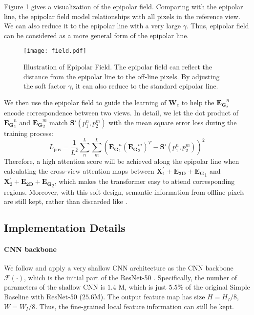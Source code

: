 \documentclass{bmvc2k}
\begin{document}
Figure \ref{fig:epipolar_example} gives a visualization of the epipolar field. Comparing with the epipolar line, the epipolar field model relationships with all pixels in the reference view. We can also reduce it to the epipolar line with a very large $\gamma$. Thus, epipolar field can be considered as a more general form of the epipolar line.  
\begin{figure}[!ht]
    \centering
    \texttt{[image: field.pdf]}
    \vspace{-1 em}
    \caption{ \footnotesize{Illustration of Epipolar Field. The epipolar field can reflect the distance from the epipolar line to the off-line pixels. By adjusting the soft factor $\gamma$, it can also reduce to the standard epipolar line.}  }
    \label{fig:epipolar_example}
\end{figure}

We then use the epipolar field to guide the learning of $\mathbf{W}_e$ to help the $\mathbf{E_G}_{i}^{n}$ encode correspondence between two views. 
In detail, we let the dot product of $\mathbf{E_G}_{1}^{n}$ and $\mathbf{E_G}_{2}^{m}$ match $\mathbf{S}'(p_1^n, p_2^m)$ with the mean square error loss during the training process: 
\begin{equation}
    \label{eq:loss_pos}
    L_{\text{pos}} = \frac{1}{L^2 } \sum_n^L \sum_m^{L} (\mathbf{E_G}_{1}^{n}  {(\mathbf{E_G}_{2}^{m})}^T -  \mathbf{S}'(p_1^n, p_2^m)  )^2
\end{equation}
Therefore, a high attention score will be achieved along the epipolar line when calculating the cross-view attention maps between $\mathbf{X}_1^{'} + \mathbf{E_{2D}} + \mathbf{E_{G}}_1 $ and $\mathbf{X}_2^{'} + \mathbf{E_{2D}} + \mathbf{E_{G}}_2$, which makes the transformer easy to attend corresponding regions. Moreover, with this soft design, semantic information from offline pixels are still kept, rather than discarded like \cite{he2020epipolar}.  




\vspace{-0.5em}
\subsection{Implementation Details}
\vspace{-0.5em}
\paragraph{CNN backbone}
We follow \cite{yang2020transpose} and apply a very shallow CNN architecture as the CNN backbone $\mathcal{F}(\cdot)$, which is the initial part of the ResNet-50 \cite{he2016deep}. Specifically, the number of parameters of the shallow CNN is $1.4$ M, which is just $5.5\%$ of the original Simple Baseline with ResNet-50  ($25.6$M).
The output feature map has size $H=H_I / 8$, $W=W_I / 8$. Thus, the fine-grained local feature information can still be kept.  
\end{document}
